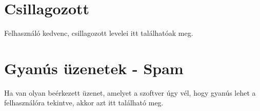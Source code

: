\section{Csillagozott}
\begin{flushleft}
    Felhasználó kedvenc, csillagozott levelei itt találhatóak meg.
\end{flushleft}

\section{Gyanús üzenetek - Spam}
\begin{flushleft}
    Ha van olyan beérkezett üzenet, amelyet a szoftver úgy vél, hogy gyanús lehet a felhasználóra tekintve, akkor azt itt található meg.
\end{flushleft}